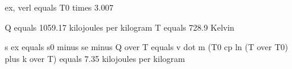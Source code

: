 ex, verl equals T0 times 3.007  

Q equals 1059.17 kilojoules per kilogram  
T equals 728.9 Kelvin  

s ex equals s0 minus se minus Q over T  
equals v dot m (T0 cp ln (T over T0) plus k over T) equals 7.35 kilojoules per kilogram